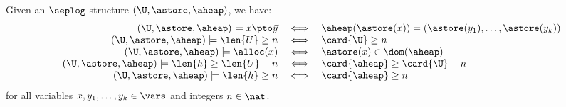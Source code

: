\begin{proposition}\label{prop:test-formulae}
  Given an $\seplog$-structure $(\U,\astore,\aheap)$, we have:
  \[\begin{array}{rcl}
  (\U,\astore,\aheap) \models x \pto \vec{y} & \iff & \aheap(\astore(x)) = (\astore(y_1),\ldots, \astore(y_k)) \\
  (\U,\astore,\aheap) \models \len{U} \geq n & \iff & \card{\U} \geq n \\
  (\U,\astore,\aheap) \models \alloc(x) & \iff & \astore(x) \in \dom(\aheap) \\
  (\U,\astore,\aheap) \models \len{h} \geq \len{U} - n & \iff & \card{\aheap} \geq \card{\U} - n \\
  (\U,\astore,\aheap) \models \len{h} \geq n & \iff & \card{\aheap} \geq n \\
  \end{array}\]
  for all variables $x, y_1, \ldots, y_k \in \vars$ and  integers $n \in \nat$. 
\end{proposition}
